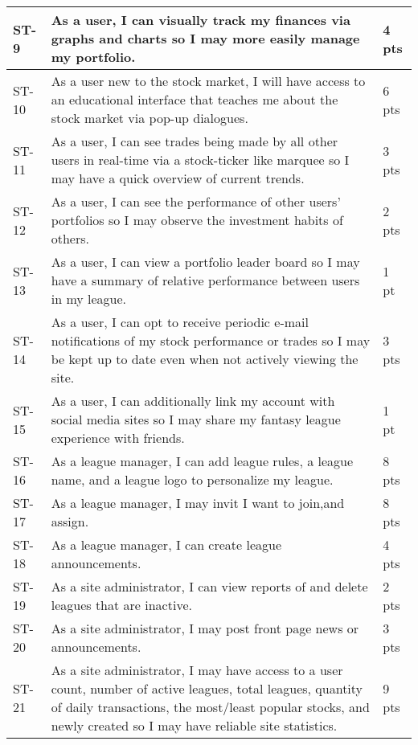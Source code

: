 \begin{longtable}{|p{0.6in}|p{4.6in}|p{0.5in}|}
ST-9&As a user, I can visually track my finances via graphs and charts so I may
more easily manage my portfolio.&4 pts  \\ \hline

ST-10&As a user new to the stock market, I will have access to an educational
interface that teaches me about the stock market via pop-up dialogues.&6 pts
\\ \hline

ST-11&As a user, I can see trades being made by all other users in real-time via
a stock-ticker like marquee so I may have a quick overview of current trends.&3
pts  \\ \hline

ST-12&As a user, I can see the performance of other users' portfolios so I may
observe the investment habits of others.&2 pts  \\ \hline

ST-13&As a user, I can view a portfolio leader board so I may have a summary of
relative performance between users in my league.&1 pt   \\ \hline

ST-14&As a user, I can opt to receive periodic e-mail notifications of my stock
performance or trades so I may be kept up to date even when not actively viewing
the site.&3 pts  \\ \hline

ST-15&As a user, I can additionally link my account with social media sites so
I may share my fantasy league experience with friends.&1 pt   \\ \hline

ST-16&As a league manager, I can add league rules, a league name, and a league
logo to personalize my league.&8 pts  \\ \hline

ST-17&As a league manager, I may invit I want to join,and assign.&8 pts
\\ \hline

ST-18&As a league manager, I can create league announcements.&4 pts  \\ \hline

ST-19&As a site administrator, I can view reports of and delete leagues that are
inactive.&2 pts  \\ \hline

ST-20&As a site administrator, I may post front page news or announcements.&3
pts  \\ \hline

ST-21&As a site administrator, I may have access to a user count, number of
active leagues, total leagues, quantity of daily transactions, the most/least
popular stocks, and newly created so I may have reliable site statistics. &9 pts
\\ \hline

\end{longtable}


